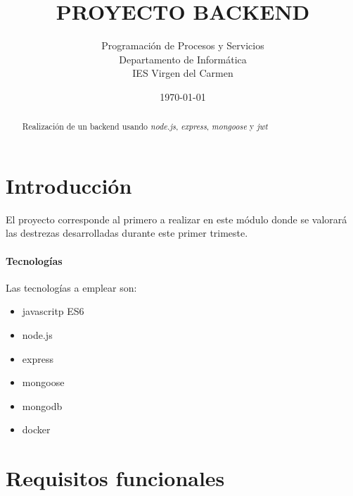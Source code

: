 \documentclass{article}
\title{PROYECTO BACKEND}
\author{Programación de Procesos y Servicios  \\
	Departamento de Informática \\
	IES Virgen del Carmen
	}
\date{\today}
\begin{document}
\maketitle


\begin{abstract}
Realización de un backend usando \emph{node.js}, \emph{express}, \emph{mongoose} y \emph{jwt}
\end{abstract}

\section{Introducción}
El proyecto corresponde al primero a realizar en este módulo donde se valorará las destrezas desarrolladas durante este primer trimeste.

\paragraph{Tecnologías}
Las tecnologías a emplear son:
\begin{itemize}
\item javascritp ES6
\item node.js
\item express
\item mongoose
\item mongodb
\item docker
\end{itemize}

\newpage

\section{Requisitos funcionales}
\end{document}
